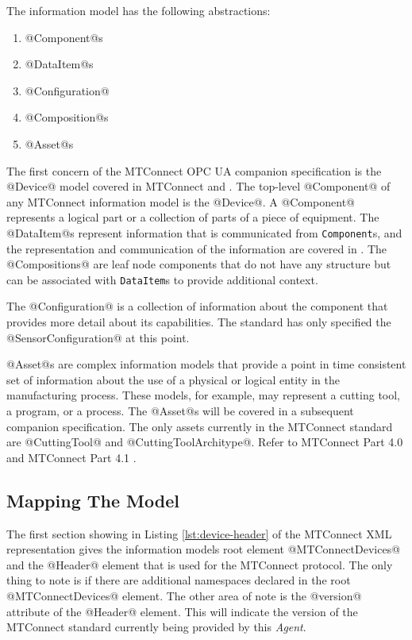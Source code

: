 The \mtconnect information model has the following abstractions:

\begin{enumerate}
\item @Component@s
\item @DataItem@s
\item @Configuration@
\item @Composition@s
\item @Asset@s
\end{enumerate}

The first concern of the MTConnect OPC UA companion specification is the @Device@ model covered in MTConnect \cite{MTCPart2} and \cite{MTCPart3}. The top-level @Component@ of any MTConnect information model is the @Device@. A @Component@ represents a logical part or a collection of parts of a piece of equipment. The @DataItem@s represent information that is communicated from \texttt{Component}s, and the representation and communication of the information are covered in \cite{MTCPart3}. The @Compositions@ are leaf node components that do not have any structure but can be associated with \texttt{DataItem}s to provide additional context. 

The @Configuration@ is a collection of information about the component that provides more detail about its capabilities. The standard has only specified the @SensorConfiguration@ at this point.

@Asset@s are complex information models that provide a point in time consistent set of information about the use of a physical or logical entity in the manufacturing process. These models, for example, may represent a cutting tool, a program, or a process. The @Asset@s will be covered in a subsequent companion specification. The only assets currently in the MTConnect standard are @CuttingTool@ and @CuttingToolArchitype@. Refer to MTConnect Part 4.0 \cite{MTCPart40} and MTConnect Part 4.1 \cite{MTCPart41}.


\subsection{Mapping The Model}

\lstset{language=XML,numbers=left,xleftmargin=2em}

The first section showing in Listing \ref{lst:device-header} of the MTConnect XML representation gives the information models root element @MTConnectDevices@ and the @Header@ element that is used for the MTConnect protocol. The only thing to note is if there are additional namespaces declared in the root @MTConnectDevices@ element. The other area of note is the @version@ attribute of the @Header@ element. This will indicate the version of the MTConnect standard currently being provided by this \textit{Agent}.

